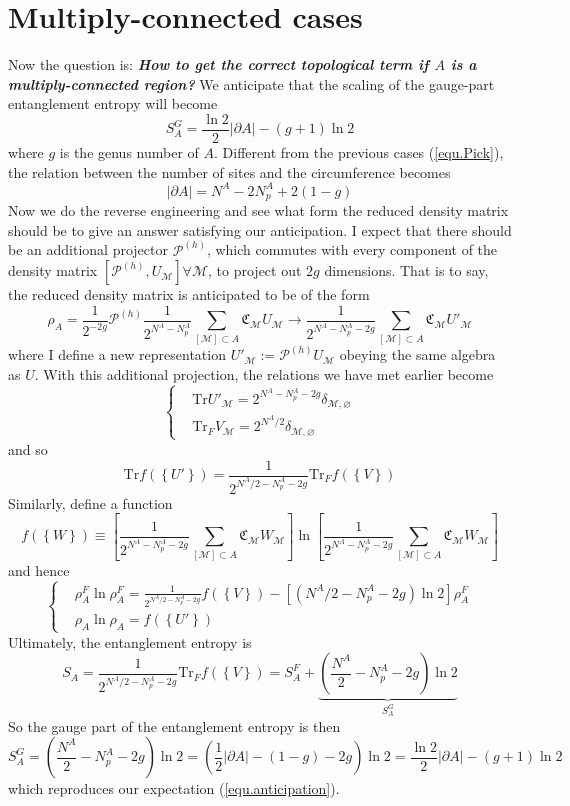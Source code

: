 \documentclass[12font]{article}
\newcommand{\lr}[1]{\left(  #1  \right)}
\newcommand{\lrm}[1]{\left[  #1  \right]}
\newcommand{\lrg}[1]{\left\{  #1  \right\}}
\newcommand{\abs}[1]{\left|  #1  \right|}
\newcommand{\de}{\partial}
\newcommand{\mrm}[1]{\mathrm{#1}}
\newcommand{\Tr}{\mrm{Tr}}
\begin{document}
\section{Multiply-connected cases}
Now the question is: \textbf{\textit{How to get the correct topological term if $A$ is a multiply-connected region?}} We anticipate that the scaling of the gauge-part entanglement entropy will become
\begin{equation}\label{equ.anticipation}
    S_A^G = \frac{\ln 2}{2}\abs{\de A} - \lr{g+1}\ln 2
\end{equation}
where $g$ is the genus number of $A$. Different from the previous cases (\ref{equ.Pick}), the relation between the number of sites and the circumference becomes
\[
\abs{\de A} = N^A - 2N^A_p + 2\lr{1-g}
\]
Now we do the reverse engineering and see what form the reduced density matrix should be to give an answer satisfying our anticipation. I expect that there should be an additional projector $\mathcal{P}^{(h)}$, which commutes with every component of the density matrix $[\mathcal{P}^{(h)},U_\mathcal{M}]\forall\mathcal{M}$, to project out $2g$ dimensions. That is to say, the reduced density matrix is anticipated to be of the form
\[
\rho_A =  \frac{1}{2^{-2g}}\mathcal{P}^{(h)} \frac{1}{2^{N^A-N^A_p}} \sum_{[\mathcal{M}]\subset A}\mathfrak{C}_\mathcal{M}U_{\mathcal{M}} \to \frac{1}{2^{N^A-N^A_p-2g}}\sum_{[\mathcal{M}]\subset A}\mathfrak{C}_\mathcal{M}U'_{\mathcal{M}}
\]
where I define a new representation $U'_\mathcal{M}:= \mathcal{P}^{(h)}U_\mathcal{M}$ obeying the same algebra as $U$. With this additional projection, the relations we have met earlier become
\[
\left\{
\begin{aligned}
&\Tr U'_{\mathcal{M}} = 2^{N^A-N^A_p-2g}\delta_{\mathcal{M},\varnothing} \\
& \Tr_F V_{\mathcal{M}} = 2^{N^A/2}\delta_{\mathcal{M},\varnothing}
\end{aligned}
\right.
\]
and so
\begin{equation}\label{equ.identity_2}
    \Tr f(\lrg{U'}) = \frac{1}{2^{N^A/2 - N^A_p-2g}}\Tr_F f(\lrg{V})
\end{equation}
Similarly, define a function 
\[
f(\lrg{W}) \equiv \lrm{\frac{1}{2^{N^A-N^A_p-2g}}\sum_{[\mathcal{M}]\subset A}\mathfrak{C}_\mathcal{M}W_{\mathcal{M}}}\ln\lrm{\frac{1}{2^{N^A-N^A_p-2g}}\sum_{[\mathcal{M}]\subset A}\mathfrak{C}_\mathcal{M}W_{\mathcal{M}}}
\]
and hence
\[
\left\{
\begin{aligned}
&\rho^F_A\ln\rho_A^F = \frac{1}{2^{N^A/2-N^A_p-2g}} f\lr{\lrg{V}} - \lrm{\lr{N^A/2-N^A_p-2g}\ln 2}\rho^F_A \\
& \rho_A\ln\rho_A = f\lr{\lrg{U'}}
\end{aligned}
\right.
\]
Ultimately, the entanglement entropy is
\[
S_A = \frac{1}{2^{N^A/2 - N^A_p-2g}}\Tr_F f(\lrg{V}) = S_A^F + \underbrace{\lr{\frac{N^A}{2}-N^A_p-2g}\ln 2}_{S^G_A}
\]
So the gauge part of the entanglement entropy is then
\[
S^G_A = \lr{\frac{N^A}{2}-N^A_p-2g}\ln 2 = \lr{\frac{1}{2}\abs{\de A}- \lr{1-g} - 2g}\ln 2 = \frac{\ln 2}{2}\abs{\de A} - \lr{g+1}\ln 2
\]
which reproduces our expectation (\ref{equ.anticipation}).
\end{document}
